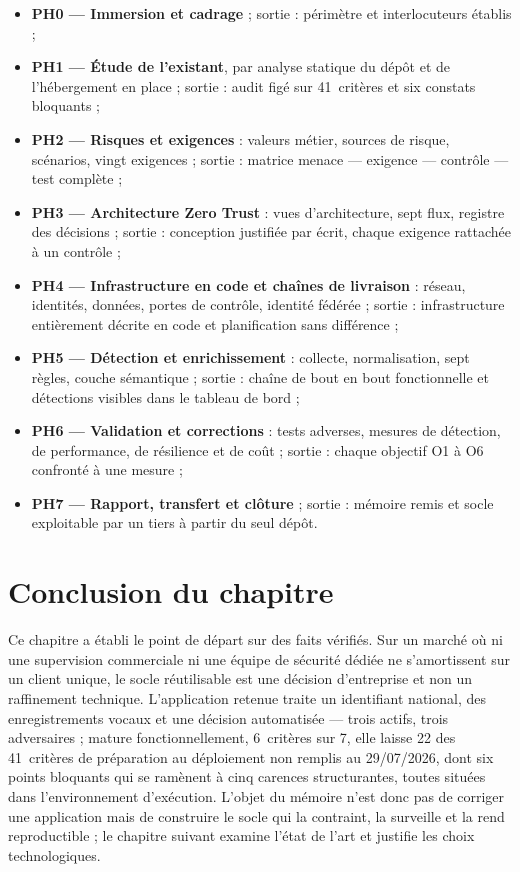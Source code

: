 \begin{itemize}\setlength{\itemsep}{1pt}
  \item \textbf{PH0 --- Immersion et cadrage} ; sortie : périmètre et interlocuteurs établis ;
  \item \textbf{PH1 --- Étude de l'existant}, par analyse statique du dépôt et de l'hébergement en place ; sortie : audit figé sur 41~critères et six constats bloquants ;
  \item \textbf{PH2 --- Risques et exigences} : valeurs métier, sources de risque, scénarios, vingt exigences ; sortie : matrice menace --- exigence --- contrôle --- test complète ;
  \item \textbf{PH3 --- Architecture Zero Trust} : vues d'architecture, sept flux, registre des décisions ; sortie : conception justifiée par écrit, chaque exigence rattachée à un contrôle ;
  \item \textbf{PH4 --- Infrastructure en code et chaînes de livraison} : réseau, identités, données, portes de contrôle, identité fédérée ; sortie : infrastructure entièrement décrite en code et planification sans différence ;
  \item \textbf{PH5 --- Détection et enrichissement} : collecte, normalisation, sept règles, couche sémantique ; sortie : chaîne de bout en bout fonctionnelle et détections visibles dans le tableau de bord ;
  \item \textbf{PH6 --- Validation et corrections} : tests adverses, mesures de détection, de performance, de résilience et de coût ; sortie : chaque objectif O1 à O6 confronté à une mesure ;
  \item \textbf{PH7 --- Rapport, transfert et clôture} ; sortie : mémoire remis et socle exploitable par un tiers à partir du seul dépôt.
\end{itemize}

\section*{Conclusion du chapitre}

Ce chapitre a établi le point de départ sur des faits vérifiés. Sur un marché où ni une supervision
commerciale ni une équipe de sécurité dédiée ne s'amortissent sur un client unique, le socle
réutilisable est une décision d'entreprise et non un raffinement technique. L'application retenue
traite un identifiant national, des enregistrements vocaux et une décision automatisée --- trois
actifs, trois adversaires ; mature fonctionnellement, 6~critères sur 7, elle laisse 22 des
41~critères de préparation au déploiement non remplis au 29/07/2026, dont six points bloquants qui
se ramènent à cinq carences structurantes, toutes situées dans l'environnement d'exécution. L'objet
du mémoire n'est donc pas de corriger une application mais de construire le socle qui la contraint,
la surveille et la rend reproductible ; le chapitre suivant examine l'état de l'art et justifie les
choix technologiques.
